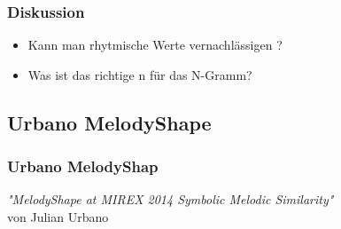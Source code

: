 \documentclass{beamer}
\begin{document}
	\begin{frame}
		\frametitle{Diskussion}
		\begin{itemize}
			\item Kann man rhytmische Werte vernachlässigen ?
			\item Was ist das richtige n für das N-Gramm?
		\end{itemize}
	\end{frame}
	
	
	\subsection{Urbano MelodyShape}
		\begin{frame}
			\frametitle{Urbano MelodyShap}
			\begin{minipage}{0.45\textwidth}
				\begin{center}
					\textit{"MelodyShape at MIREX 2014 Symbolic Melodic Similarity"} 
					\cite{five_point_two}\\ 
					von Julian Urbano
				\end{center}
			\end{minipage}%
			\begin{minipage}{0.45\textwidth}
				\begin{figure}[h!]
				\end{figure}
			\end{minipage}
		\end{frame}
		
\end{document}
